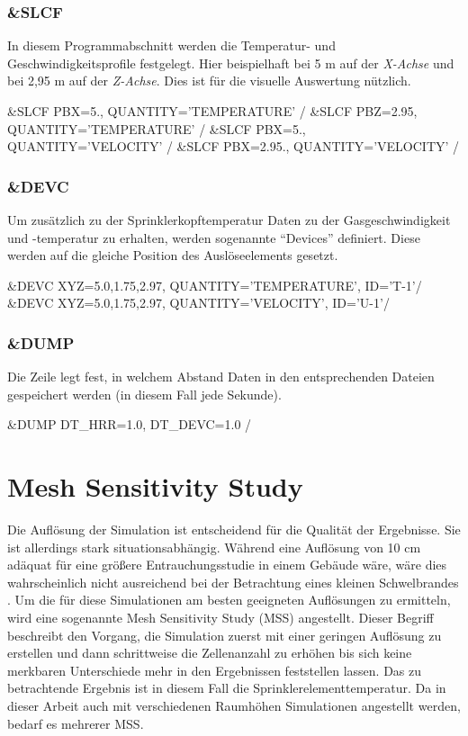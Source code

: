 \subsubsection{\&SLCF}
In diesem Programmabschnitt werden die Temperatur- und Geschwindigkeitsprofile festgelegt. Hier beispielhaft bei 5 m auf der \emph{X-Achse} und bei 2,95 m auf der \emph{Z-Achse}. Dies ist für die visuelle Auswertung nützlich.
\begin{GenericCode}[numbers=none]
&SLCF PBX=5., QUANTITY='TEMPERATURE' /
&SLCF PBZ=2.95, QUANTITY='TEMPERATURE' /
&SLCF PBX=5., QUANTITY='VELOCITY' /
&SLCF PBX=2.95., QUANTITY='VELOCITY' /
\end{GenericCode}

\subsubsection{\&DEVC}
Um zusätzlich zu der Sprinklerkopftemperatur Daten zu der Gasgeschwindigkeit und -tem\-pe\-ra\-tur zu erhalten, werden sogenannte "`Devices"' definiert. Diese werden auf die gleiche Position des Auslöseelements gesetzt.

\begin{GenericCode}[numbers=none]
&DEVC XYZ=5.0,1.75,2.97, QUANTITY='TEMPERATURE', ID='T-1'/
&DEVC XYZ=5.0,1.75,2.97, QUANTITY='VELOCITY', ID='U-1'/
\end{GenericCode}

\subsubsection{\&DUMP}
Die  Zeile legt fest, in welchem Abstand Daten in den entsprechenden Dateien gespeichert werden (in diesem Fall jede Sekunde).

\begin{GenericCode}[numbers=none]
&DUMP DT_HRR=1.0, DT_DEVC=1.0 /
\end{GenericCode}

\section{Mesh Sensitivity Study}
\label{sec:MeshSS}

Die Auflösung der Simulation ist entscheidend für die Qualität der Ergebnisse. Sie ist allerdings stark situationsabhängig. Während eine Auflösung von 10 cm adäquat für eine größere Entrauchungsstudie in einem Gebäude wäre, wäre dies wahrscheinlich nicht ausreichend bei der Betrachtung eines kleinen Schwelbrandes \cite[S. 44]{FDSUser}. 
Um die für diese Simulationen am besten geeigneten Auflösungen zu ermitteln, wird eine sogenannte Mesh Sensitivity Study (MSS) angestellt. Dieser Begriff beschreibt den Vorgang, die Simulation zuerst mit einer geringen Auflösung zu erstellen und dann schrittweise die Zellenanzahl zu erhöhen bis sich keine merkbaren Unterschiede mehr in den Ergebnissen feststellen lassen. Das zu betrachtende Ergebnis ist in diesem Fall die Sprinklerelementtemperatur. 
Da in dieser Arbeit auch mit verschiedenen Raumhöhen Simulationen angestellt werden, bedarf es mehrerer MSS.

